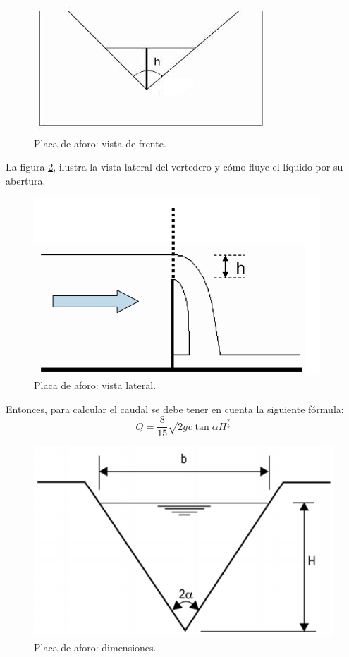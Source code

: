 \begin{figure}[htpb]
\centering
\includegraphics[scale=.75]{./Figures/PlacaDeAforo.jpeg}
\caption{Placa de aforo: vista de frente.}
\label{fig:Placa de aforo}
\end{figure}

\vspace{1cm}
La figura \ref{fig:Placa de aforo-VistaLateral}, ilustra la vista lateral del vertedero y cómo fluye el líquido por su abertura.

\begin{figure}[htpb]
\centering
\includegraphics[scale=.75]{./Figures/PlacaDeAforo-VistaLateral.png}
\caption{Placa de aforo: vista lateral.}
\label{fig:Placa de aforo-VistaLateral}
\end{figure}

Entonces, para calcular el caudal se debe tener en cuenta la siguiente fórmula:
\begin{equation}
 \label{eq:caudal}
 Q = \frac{8}{15}\sqrt{2g} c \tan\alpha  H^\frac{2}{5} 
\end{equation}
	
\begin{figure}[htpb]
\centering
\includegraphics[scale=.75]{./Figures/DimensionesPlacaAforo.png}
\caption{Placa de aforo: dimensiones.}
\label{fig:Placa de aforo dimensiones}
\end{figure}	

